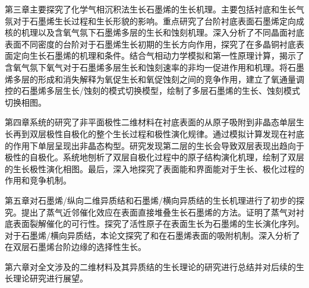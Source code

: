     第三章主要探究了化学气相沉积法生长石墨烯的生长机理。主要包括衬底和生长气氛对于石墨烯生长过程和生长形貌的影响。重点研究了台阶衬底表面石墨烯定向成核的机理以及含氧气氛下石墨烯多层的生长和蚀刻机理。深入分析了不同晶面衬底表面不同密度的台阶对于石墨烯生长初期的生长方向作用，探究了在多晶铜衬底表面定向生长石墨烯的机理和条件。结合气相动力学模拟和第一性原理计算，揭示了含氧气氛下氧气对于石墨烯多层生长和蚀刻速率的非均一促进作用和机理。将石墨烯多层的形成和消失解释为氧促生长和氧促蚀刻之间的竞争作用，建立了氧通量调控的石墨烯多层生长/蚀刻的模式切换模型，绘制了多层石墨烯的生长、蚀刻模式切换相图。

    第四章系统的研究了非平面极性二维材料在衬底表面的从原子吸附到非晶态单层生长再到双层极性自极化的整个生长过程和极性演化规律。通过模拟计算发现在衬底的作用下单层呈现出非晶态构型。研究发现第二层的生长会导致双层表现出趋向于极性的自极化。系统地刨析了双层自极化过程中的原子结构演化机理，绘制了双层的生长极性演化相图。最后，深入地探究了表面能和界面能对于生长、极化过程的作用和竞争机制。

    第五章对石墨烯/纵向二维异质结和石墨烯/横向异质结的生长机理进行了初步的探究。提出了蒸气近邻催化效应在表面直接堆叠生长石墨烯的方法。证明了蒸气对衬底表面裂解催化的可行性。探究了活性原子在表面生长为石墨烯的生长演化序列。对于石墨烯/横向异质结，本论文探究了和在石墨烯表面的吸附机制。深入分析了在双层石墨烯台阶边缘的选择性生长。

    第六章对全文涉及的二维材料及其异质结的生长理论的研究进行总结并对后续的生长理论研究进行展望。

